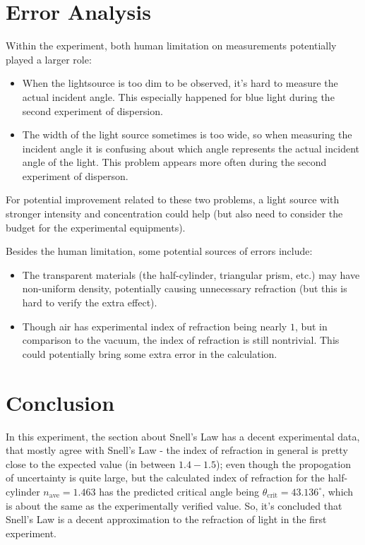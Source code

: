 \documentclass{article}
\begin{document}
\section{Error Analysis}
Within the experiment, both human limitation on measurements potentially played a larger role:
\begin{itemize}
    \item When the lightsource is too dim to be observed, it's hard to measure the actual incident angle. This especially happened for blue light during the second experiment of dispersion.
    \item The width of the light source sometimes is too wide, so when measuring the incident angle it is confusing about which angle represents the actual incident angle of the light. This problem appears more often during the second experiment of disperson.
\end{itemize}
For potential improvement related to these two problems, a light source with stronger intensity and concentration could help (but also need to consider the budget for the experimental equipments). 

\hfil

Besides the human limitation, some potential sources of errors include:
\begin{itemize}
    \item The transparent materials (the half-cylinder, triangular prism, etc.) may have non-uniform density, potentially causing unnecessary refraction (but this is hard to verify the extra effect).
    \item Though air has experimental index of refraction being nearly $1$, but in comparison to the vacuum, the index of refraction is still nontrivial. This could potentially bring some extra error in the calculation.
\end{itemize}

\hfil

\section{Conclusion}
In this experiment, the section about Snell's Law has a decent experimental data, that mostly agree with Snell's Law - the index of refraction in general is pretty close to the expected value (in between $1.4-1.5$); even though the propogation of uncertainty is quite large, but the calculated index of refraction for the half-cylinder $n_\text{ave}=1.463$ has the predicted critical angle being $\theta_\text{crit} = 43.136^\circ$, which is about the same as the experimentally verified value. So, it's concluded that Snell's Law is a decent approximation to the refraction of light in the first experiment.
\end{document}
